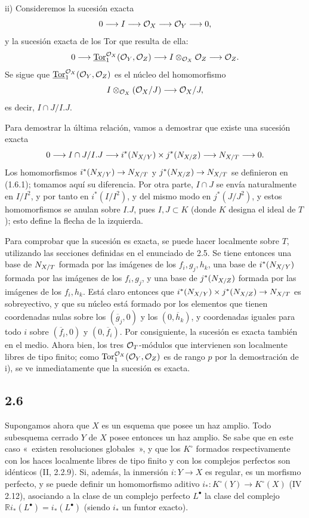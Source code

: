 ii) Consideremos la sucesión exacta
\[
0\longrightarrow I\longrightarrow \cO_X\longrightarrow \cO_Y\longrightarrow0,
\]
y la sucesión exacta de los Tor que resulta de ella:
\[
0\longrightarrow\underline{\Tor}_1^{\cO_X}(\cO_Y,\cO_Z)
\longrightarrow I\otimes_{\cO_X}\cO_Z
\longrightarrow \cO_Z.
\]
Se sigue que \(\underline{\Tor}_1^{\cO_X}(\cO_Y,\cO_Z)\) es el núcleo del homomorfismo
\[
I\otimes_{\cO_X}(\cO_X/J)\longrightarrow \cO_X/J,
\]
es decir, \(I\cap J/I.J\).

Para demostrar la última relación, vamos a demostrar que existe una sucesión exacta
\[
0\longrightarrow I\cap J/I.J
\longrightarrow i^*(\sisi{N_{Y/X}}{N_{X/Y}})\times j^*(\sisi{N_{Z/X}}{N_{X/Z}})
\longrightarrow \sisi{N_{T/X}}{N_{X/T}}\longrightarrow0.
\]
Los homomorfismos \(i^*(\sisi{N_{Y/X}}{N_{X/Y}})\to \sisi{N_{T/X}}{N_{X/T}}\) y \(j^*(\sisi{N_{Z/X}}{N_{X/Z}})\to \sisi{N_{T/X}}{N_{X/T}}\) se definieron en (1.6.1); tomamos aquí su diferencia. Por otra parte, \(I\cap J\) se envía naturalmente en \(I/I^2\), y por tanto en \(i^*(I/I^2)\), y del mismo modo en \(j^*(J/J^2)\), y estos homomorfismos se anulan sobre \(I.J\), pues \(I,J\subset K\) (donde \(K\) designa el ideal de \(T\)); esto define la flecha de la izquierda.

Para comprobar que la sucesión es exacta, se puede hacer localmente sobre \(T\), utilizando las secciones definidas en el enunciado de 2.5. Se tiene entonces una base de \(\sisi{N_{T/X}}{N_{X/T}}\) formada por las imágenes de los \(f_i,g_j,h_k\), una base de \(i^*(\sisi{N_{Y/X}}{N_{X/Y}})\) formada por las imágenes de los \(f_i,g_j\), y una base de \(j^*(\sisi{N_{Z/X}}{N_{X/Z}})\) formada por las imágenes de los \(f_i,h_k\). Está claro entonces que \(i^*(\sisi{N_{Y/X}}{N_{X/Y}})\times j^*(\sisi{N_{Z/X}}{N_{X/Z}})\to \sisi{N_{T/X}}{N_{X/T}}\) es sobreyectivo, y que su núcleo está formado por los elementos que tienen coordenadas nulas sobre los \((\overline g_j,0)\) y los \((0,\overline h_k)\), y coordenadas iguales para todo \(i\) sobre \((\overline f_i,0)\) y \((0,\overline f_i)\). Por consiguiente, la sucesión es exacta también en el medio. Ahora bien, los tres \(\cO_T\)-módulos que intervienen son localmente libres de tipo finito; como \(\Tor_1^{\cO_X}(\cO_Y,\cO_Z)\) es de rango \(p\) por la demostración de i), se ve inmediatamente que la sucesión es exacta.

\subsection*{2.6}
Supongamos ahora que \(X\) es un esquema que posee un haz amplio. Todo subesquema cerrado \(Y\) de \(X\) posee entonces un haz amplio. Se sabe que en este caso «~existen resoluciones globales~», y que los \(K^\circ\) formados respectivamente con los haces localmente libres de tipo finito y con los complejos perfectos son idénticos (II, 2.2.9). Si, además, la inmersión \(i:Y\to X\) es regular, es un morfismo perfecto, y se puede definir un homomorfismo aditivo \(i_*:K^\circ(Y)\longrightarrow K^\circ(X)\) (IV 2.12), asociando a la clase de un complejo perfecto \(L^\bullet\) la clase del complejo \(\mathbb Ri_*(L^\bullet)=i_*(L^\bullet)\) (siendo \(i_*\) un funtor exacto).

